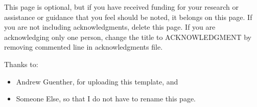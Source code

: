 
\begin{acknowledgments}

    This page is optional, but if you have received funding for your research or assistance or guidance that you feel should be noted, it belongs on this page. If you are not including acknowledgments, delete this page. If you are acknowledging only one person, change the title to ACKNOWLEDGMENT by removing commented line in acknowledgments file.

    Thanks to:
    \begin{itemize}
        \item Andrew Guenther, for uploading this template, and
        \item Someone Else, so that I do not have to rename this page.
    \end{itemize}
\end{acknowledgments}
